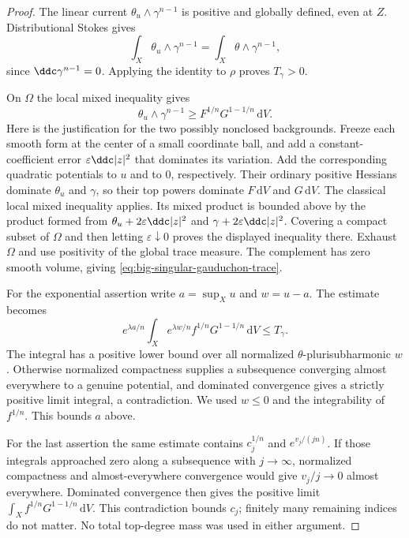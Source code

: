 \begin{proof}
The linear current $\theta_u\wedge\gamma^{n-1}$ is positive and globally defined, even at $Z$. Distributional Stokes gives
\[
 \int_X\theta_u\wedge\gamma^{n-1}
 =\int_X\theta\wedge\gamma^{n-1},
\]
since $\ddc\gamma^{n-1}=0$. Applying the identity to $\rho$ proves $T_\gamma>0$.

On $\Omega$ the local mixed inequality gives
\[
 \theta_u\wedge\gamma^{n-1}\geq
 F^{1/n}G^{1-1/n}\,\mathrm{d}V.
\]
Here is the justification for the two possibly nonclosed backgrounds. Freeze each smooth form at the center of a small coordinate ball, and add a constant-coefficient error $\varepsilon\ddc|z|^2$ that dominates its variation. Add the corresponding quadratic potentials to $u$ and to $0$, respectively. Their ordinary positive Hessians dominate $\theta_u$ and $\gamma$, so their top powers dominate $F\,\mathrm{d}V$ and $G\,\mathrm{d}V$. The classical local mixed inequality \cite[Theorem 1.2]{Dinew09} applies. Its mixed product is bounded above by the product formed from $\theta_u+2\varepsilon\ddc|z|^2$ and $\gamma+2\varepsilon\ddc|z|^2$. Covering a compact subset of $\Omega$ and then letting $\varepsilon\downarrow0$ proves the displayed inequality there. Exhaust $\Omega$ and use positivity of the global trace measure. The complement has zero smooth volume, giving \eqref{eq:big-singular-gauduchon-trace}.

For the exponential assertion write $a=\sup_Xu$ and $w=u-a$. The estimate becomes
\[
 e^{\lambda a/n}\int_Xe^{\lambda w/n}f^{1/n}G^{1-1/n}\,\mathrm{d}V
 \leq T_\gamma.
\]
The integral has a positive lower bound over all normalized $\theta$-plurisubharmonic $w$. Otherwise normalized compactness supplies a subsequence converging almost everywhere to a genuine potential, and dominated convergence gives a strictly positive limit integral, a contradiction. We used $w\leq0$ and the integrability of $f^{1/n}$. This bounds $a$ above.

For the last assertion the same estimate contains $c_j^{1/n}$ and $e^{v_j/(jn)}$. If those integrals approached zero along a subsequence with $j\to\infty$, normalized compactness and almost-everywhere convergence would give $v_j/j\to0$ almost everywhere. Dominated convergence then gives the positive limit $\int_Xf^{1/n}G^{1-1/n}\,\mathrm{d}V$. This contradiction bounds $c_j$; finitely many remaining indices do not matter. No total top-degree mass was used in either argument.
\end{proof}
